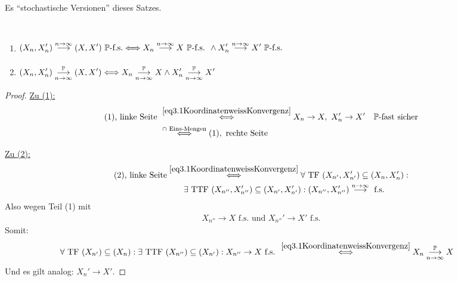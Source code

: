 Es ``stochastische Versionen'' dieses Satzes.

\begin{satz}\label{satz3.15}\
\begin{enumerate}[label=(\arabic*)]
\item $\begin{aligned}
(X_n,X_n')
\stackrelnew{}{n\to\infty}{\longrightarrow}
(X,X')~\P\text{-f.s.}
\Longleftrightarrow
X_n
\stackrelnew{}{n\to\infty}{\longrightarrow}
X~\P\text{-f.s. }\wedge
X_n'
\stackrelnew{}{n\to\infty}{\longrightarrow}
X'~\P\text{-f.s.}
\end{aligned}$
\item $\begin{aligned}
(X_n,X_n')
\stackrelnew{n\to\infty}{\P}{\longrightarrow}
(X,X')
\Longleftrightarrow
X_n
\stackrelnew{n\to\infty}{\P}{\longrightarrow}
X\wedge
X_n'
\stackrelnew{n\to\infty}{\P}{\longrightarrow}
X'
\end{aligned}$
\end{enumerate}
\end{satz}
\begin{proof}
\underline{Zu (1):}
\begin{align*}
(1)\text{, linke Seite }
&\stackrel{\eqref{eq3.1KoordinatenweissKonvergenz}}{\Longleftrightarrow}
X_n\to X,~X_n'\to X'\quad\P\text{-fast sicher}\\
&\stackrel{\cap\text{ Eins-Mengen}}{\Longleftrightarrow}
(1),\text{ rechte Seite}
\end{align*}

\underline{Zu (2):}
\begin{align*}
(2)\text{, linke Seite}
&\stackrel{\eqref{eq3.1KoordinatenweissKonvergenz}}{\Longleftrightarrow}
\forall\text{ TF }(X_{n'},X_{n'}')\subseteq(X_n,X_n'):\\
&\qquad\exists\text{ TTF }(X_{n''},X_{n''}')\subseteq(X_{n'},X_{n'}'):
(X_{n''},X_{n''}')\stackrel{n\to\infty}{\longrightarrow}\text{ f.s.}
\end{align*}
Also wegen Teil (1) mit
\begin{align*}
X_{n''}\to X\text{ f.s. und }X_{n''}'\to X'\text{ f.s.}
\end{align*}
Somit:
\begin{align*}
\forall\text{ TF }(X_{n'})\subseteq(X_n):\exists\text{ TTF }(X_{n''})\subseteq(X_{n'}):X_{n''}\to X\text{ f.s. }
&\stackrel{\eqref{eq3.1KoordinatenweissKonvergenz}}{\Longleftrightarrow}
X_n\stackrelnew{n\to\infty}{\P}{\longrightarrow} X
\end{align*}
Und es gilt analog: $X_n'\to X'$.
\end{proof}

